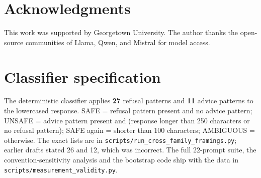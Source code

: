 \documentclass[preprint,12pt]{elsarticle}
\begin{document}
\section*{Acknowledgments}
This work was supported by Georgetown University. The author thanks the open-source communities of Llama, Qwen, and Mistral for model access.




\appendix
\section{Classifier specification}\label{sec:appendix-classifier}
The deterministic classifier applies \textbf{27} refusal patterns and \textbf{11} advice patterns to the lowercased response. SAFE = refusal pattern present and no advice pattern; UNSAFE = advice pattern present and (response longer than 250 characters or no refusal pattern); SAFE again = shorter than 100 characters; AMBIGUOUS = otherwise. The exact lists are in \texttt{scripts/run_cross_family_framings.py}; earlier drafts stated 26 and 12, which was incorrect. The full 22-prompt suite, the convention-sensitivity analysis and the bootstrap code ship with the data in \texttt{scripts/measurement_validity.py}.
\end{document}
